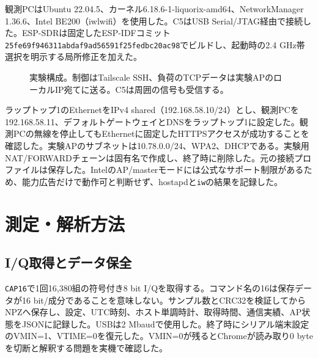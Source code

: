 \documentclass[a4paper,10pt]{ltjsarticle}
\begin{document}
観測PCはUbuntu 22.04.5、カーネル6.18.6-1-liquorix-amd64、NetworkManager 1.36.6、Intel BE200（iwlwifi）を使用した。C5はUSB Serial/JTAG経由で接続した。ESP-SDR\cite{sdr}は固定したESP-IDFコミット\texttt{25fe69f946311abdaf9ad56591f25fedbc20ac98}でビルドし、起動時の2.4 GHz帯選択を明示する局所修正を加えた。

\begin{figure}[htbp]\centering
{}
\caption{実験構成。制御はTailscale SSH、負荷のTCPデータは実験APのローカルIP宛てに送る。C5は周囲の信号も受信する。}\end{figure}

ラップトップ1のEthernetをIPv4 shared（192.168.58.10/24）とし、観測PCを192.168.58.11、デフォルトゲートウェイとDNSをラップトップ1に設定した。観測PCの無線を停止してもEthernetに固定したHTTPSアクセスが成功することを確認した。実験APのサブネットは10.78.0.0/24、WPA2、DHCPである。実験用NAT/FORWARDチェーンは固有名で作成し、終了時に削除した。元の接続プロファイルは保存した。IntelのAP/masterモードには公式なサポート制限がある\cite{intel,iwl}ため、能力広告だけで動作可と判断せず、hostapdと\texttt{iw}の結果を記録した。

\section{測定・解析方法}
\subsection{I/Q取得とデータ保全}
\texttt{CAP16}で1回16,380組の符号付き8 bit I/Qを取得する。コマンド名の16は保存データが16 bit/成分であることを意味しない。サンプル数とCRC32を検証してからNPZへ保存し、設定、UTC時刻、ホスト単調時計、取得時間、通信実績、AP状態をJSONに記録した。USBは2 Mbaudで使用した。終了時にシリアル端末設定のVMIN=1、VTIME=0を復元した。VMIN=0が残るとChromeが読み取り0 byteを切断と解釈する問題を実機で確認した。
\end{document}
